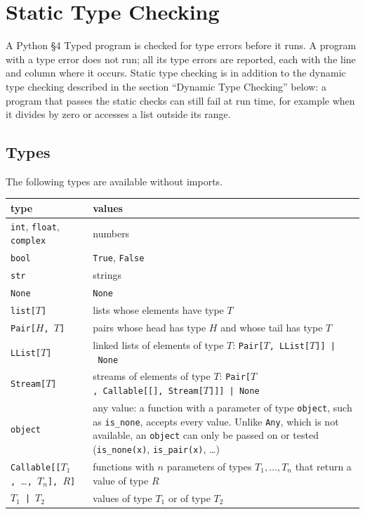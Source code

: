 \section{Static Type Checking}

A Python \S 4 Typed program is checked for type errors before it runs. A program with a type
error does not run; all its type errors are reported, each with the line and column where it
occurs. Static type checking is in addition to the dynamic type checking described in the
section ``Dynamic Type Checking'' below: a program that passes the static checks can still fail at
run time, for example when it divides by zero or accesses a list outside its range.

\subsection*{Types}

The following types are available without imports.

\begin{center}
  \begin{tabular}{l|p{}}
    type & values \\ \hline
    \texttt{int}, \texttt{float}, \texttt{complex} & numbers \\
    \texttt{bool} & \texttt{True}, \texttt{False} \\
    \texttt{str} & strings \\
    \texttt{None} & \texttt{None} \\
    \texttt{list[}$T$\texttt{]} & lists whose elements have type $T$ \\
    \texttt{Pair[}$H$\texttt{,~}$T$\texttt{]} & pairs whose head has type $H$ and whose tail has type $T$ \\
    \texttt{LList[}$T$\texttt{]} & linked lists of elements of type $T$:\newline
                                    \texttt{Pair[}$T$\texttt{,~LList[}$T$\texttt{]]~|~None} \\
    \texttt{Stream[}$T$\texttt{]} & streams of elements of type $T$:\newline
                                     \texttt{Pair[}$T$\texttt{,~Callable[[],~Stream[}$T$\texttt{]]]~|~None} \\
    \texttt{object} & any value: a function with a parameter of type \texttt{object}, such as
      \texttt{is\_none}, accepts every value. Unlike \texttt{Any}, which is not available, an
      \texttt{object} can only be passed on or tested (\texttt{is\_none(x)}, \texttt{is\_pair(x)}, \ldots) \\
    \texttt{Callable[[}$T_1$\texttt{,~}\ldots\texttt{,~}$T_n$\texttt{],~}$R$\texttt{]}
        & functions with $n$ parameters of types $T_1, \ldots, T_n$ that return a value of type $R$ \\
    $T_1$~\texttt{|}~$T_2$ & values of type $T_1$ or of type $T_2$ \\
  \end{tabular}
\end{center}

